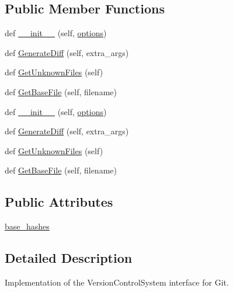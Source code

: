 \subsection*{Public Member Functions}
\begin{DoxyCompactItemize}
\item 
def \hyperlink{classupload_1_1_git_v_c_s_aba4e1dca1c4b3e5db7ba07f6bce3c839}{\+\_\+\+\_\+init\+\_\+\+\_\+} (self, \hyperlink{classupload_1_1_version_control_system_a4d57d043bc408887b94269fe4cea9556}{options})
\item 
def \hyperlink{classupload_1_1_git_v_c_s_a3ebfc01cebc9b585706ad3f4389a8833}{Generate\+Diff} (self, extra\+\_\+args)
\item 
def \hyperlink{classupload_1_1_git_v_c_s_ae4e8c0e9fa01619c6a5c76d1ab84b995}{Get\+Unknown\+Files} (self)
\item 
def \hyperlink{classupload_1_1_git_v_c_s_a70ddb65a6b512b8cb8cc4affa37ff9b4}{Get\+Base\+File} (self, filename)
\item 
def \hyperlink{classupload_1_1_git_v_c_s_aba4e1dca1c4b3e5db7ba07f6bce3c839}{\+\_\+\+\_\+init\+\_\+\+\_\+} (self, \hyperlink{classupload_1_1_version_control_system_a4d57d043bc408887b94269fe4cea9556}{options})
\item 
def \hyperlink{classupload_1_1_git_v_c_s_a3ebfc01cebc9b585706ad3f4389a8833}{Generate\+Diff} (self, extra\+\_\+args)
\item 
def \hyperlink{classupload_1_1_git_v_c_s_ae4e8c0e9fa01619c6a5c76d1ab84b995}{Get\+Unknown\+Files} (self)
\item 
def \hyperlink{classupload_1_1_git_v_c_s_a70ddb65a6b512b8cb8cc4affa37ff9b4}{Get\+Base\+File} (self, filename)
\end{DoxyCompactItemize}
\subsection*{Public Attributes}
\begin{DoxyCompactItemize}
\item 
\hyperlink{classupload_1_1_git_v_c_s_a07e9469050a157f34fe804cdf6ecddac}{base\+\_\+hashes}
\end{DoxyCompactItemize}


\subsection{Detailed Description}
\begin{DoxyVerb}Implementation of the VersionControlSystem interface for Git.\end{DoxyVerb}
 

